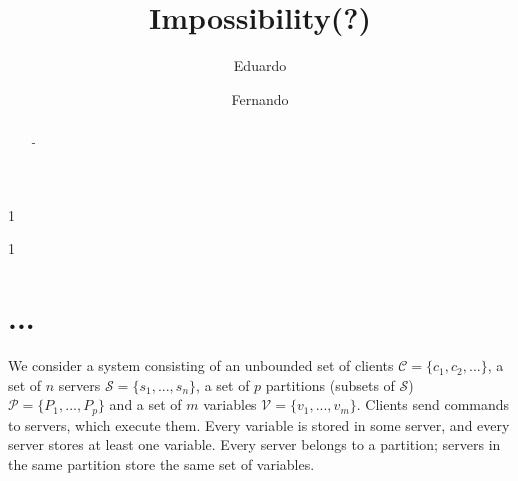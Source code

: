 \documentclass{usiinftr}
\begin{document}
%
%
\title{Impossibility(?)}

%
%
\author{Eduardo}{1}
\author{Fernando}{1}

%
%

%
%

\newcommand{\ex}{$\mathcal{E}$}
\newcommand{\pp}{$\mathcal{P}$}
\newcommand{\ppm}{\mathcal{P}}
\newcommand{\cc}{$\mathcal{C}$}
\newcommand{\ccm}{\mathcal{C}}
\newcommand{\vv}{$\mathcal{V}$}
\newcommand{\vvm}{\mathcal{V}}
\newcommand{\rr}{$\mathcal{R}$}
\newcommand{\rrm}{\mathcal{R}}
\newcommand{\sst}{$\mathcal{S}$}
\newcommand{\ssm}{\mathcal{S}}
\newcommand{\ts}{\text{\textit{ts}}}
\newcommand{\sendersTo}{\text{\textit{sendersTo}}}
\newcommand{\readv}{\text{\textit{read}}}
\newcommand{\writev}{\text{\textit{write}}}
\newcommand{\comp}{\text{\textit{computation}}}
\newcommand{\send}{\text{\textit{send}}}
\newcommand{\recv}{\text{\textit{receive}}}

%
%

%
%


\maketitle

\begin{abstract}
-
\end{abstract}

\section{...}

We consider a system consisting of an unbounded set of clients $\ccm = \{c_1, c_2, ...\}$, a set of $n$ servers $\ssm = \{s_1, ..., s_n\}$, a set of $p$ partitions (subsets of \sst) $\ppm = \{P_1, ..., P_p\}$ and a set of $m$ variables $\vvm = \{v_1, ..., v_m\}$. Clients send commands to servers, which execute them. Every variable is stored in some server, and every server stores at least one variable. Every server belongs to a partition; servers in the same partition store the same set of variables.
\end{document}
